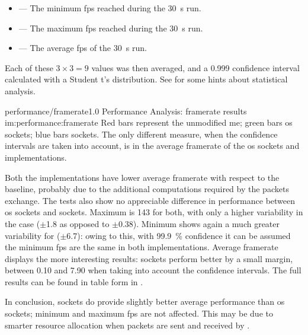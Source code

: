 \begin{itemize}
	\item {} --- The minimum \gls{fps} reached during the \SI{30}{\second} run.
	\item {} --- The maximum \gls{fps} reached during the \SI{30}{\second} run.
	\item {} --- The average \gls{fps} of the \SI{30}{\second} run.
\end{itemize}

\FLOATnoindent Each of these $3\times3=9$ values was then averaged, and a \num{0,999} confidence interval calculated with a Student t's distribution. See  for some hints about statistical analysis.

\begin{image}
	{performance/framerate}{1.0}
	{Performance Analysis: framerate results}
	{im:performance:framerate}
	{}
	{Red bars represent the unmodified \gls{me}; green bars \gls{os} sockets; blue bars  sockets. The only different measure, when the confidence intervals are taken into account, is in the average \gls{framerate} of the \gls{os} sockets and  implementations.}
\end{image}

Both the implementations have lower average \gls{framerate} with respect to the baseline, probably due to the additional computations required by the \glspl{packet} exchange. The tests also show no appreciable difference in performance between \gls{os} sockets and  sockets. Maximum is \SI{143}{\fps} for both, with only a higher variability in the  case ($\pm$\SI{1,8}{\fps} as opposed to $\pm$\SI{0,38}{\fps}). Minimum shows again a much greater variability for  ($\pm$\SI{6,7}{\fps}): owing to this, with \SI{99,9}{\percent} confidence it can be assumed the minimum \gls{fps} are the same in both implementations. Average \gls{framerate} displays the more interesting results:  sockets perform better by a small margin, between \SI{0,10}{\fps} and \SI{7,90}{\fps} when taking into account the confidence intervals. The full results can be found in table form in .

In conclusion,  sockets do provide slightly better average performance than \gls{os} sockets; minimum and maximum \gls{fps} are not affected. This may be due to smarter resource allocation when \glspl{packet} are sent and received by .

